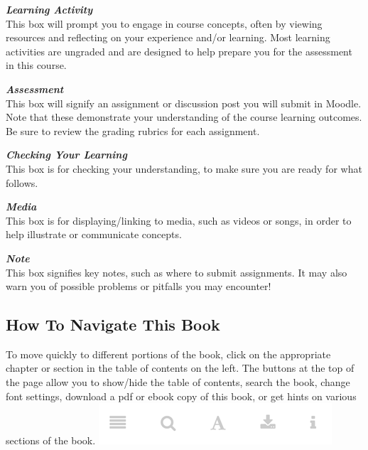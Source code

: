 \documentclass[
]{book}
\begin{document}
\begin{reflect}
 \textbf{\emph{Learning Activity}}\\
 This box will prompt you to engage in course concepts, often by viewing
 resources and reflecting on your experience and/or learning. Most
 learning activities are ungraded and are designed to help prepare you
 for the assessment in this course.
 \end{reflect}

\begin{assessment}
 \textbf{\emph{Assessment}}\\
 This box will signify an assignment or discussion post you will submit
 in Moodle. Note that these demonstrate your understanding of the course
 learning outcomes. Be sure to review the grading rubrics for each
 assignment.
 \end{assessment}

\begin{progress}
 \textbf{\emph{Checking Your Learning}}\\
 This box is for checking your understanding, to make sure you are ready
 for what follows.
 \end{progress}

\begin{video}
 \textbf{\emph{Media}}\\
 This box is for displaying/linking to media, such as videos or songs, in
 order to help illustrate or communicate concepts.
 \end{video}

\begin{caution}
 \textbf{\emph{Note}}\\
 This box signifies key notes, such as where to submit assignments. It
 may also warn you of possible problems or pitfalls you may encounter!
 \end{caution}

\hypertarget{how-to-navigate-this-book}{%
\subsection*{How To Navigate This Book}\label{how-to-navigate-this-book}}

To move quickly to different portions of the book, click on the appropriate chapter or section in the table of contents on the left. The buttons at the top of the page allow you to show/hide the table of contents, search the book, change font settings, download a pdf or ebook copy of this book, or get hints on various sections of the book.
\includegraphics{assets/course-intro/menu.png}
\end{document}
